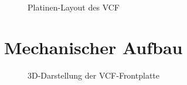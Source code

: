 \begin{figure}[h]
	\centering
	\setlength{\fboxsep}{1pt} %
	\setlength{\fboxrule}{1pt} %
	\caption{Platinen-Layout des VCF}
	\label{fig:toleranzschema}
\end{figure}

\section{Mechanischer Aufbau}
\begin{figure}[h]
	\centering
	\setlength{\fboxsep}{1pt} %
	\setlength{\fboxrule}{1pt} %
	\caption{3D-Darstellung der VCF-Frontplatte}
	\label{fig:toleranzschema}
\end{figure}
